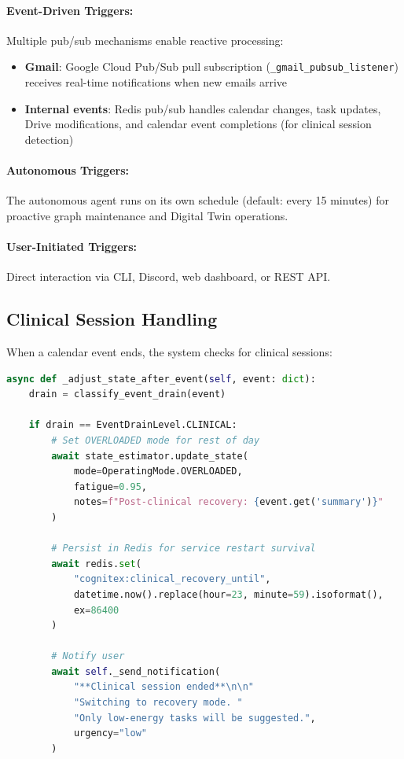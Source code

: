\documentclass[11pt,a4paper]{article}
\begin{document}
\paragraph{Event-Driven Triggers:} Multiple pub/sub mechanisms enable reactive processing:
\begin{itemize}
    \item \textbf{Gmail}: Google Cloud Pub/Sub pull subscription (\texttt{\_gmail\_pubsub\_listener}) receives real-time notifications when new emails arrive
    \item \textbf{Internal events}: Redis pub/sub handles calendar changes, task updates, Drive modifications, and calendar event completions (for clinical session detection)
\end{itemize}

\paragraph{Autonomous Triggers:} The autonomous agent runs on its own schedule (default: every 15 minutes) for proactive graph maintenance and Digital Twin operations.

\paragraph{User-Initiated Triggers:} Direct interaction via CLI, Discord, web dashboard, or REST API.

\subsection{Clinical Session Handling}

When a calendar event ends, the system checks for clinical sessions:

\begin{lstlisting}[language=Python]
async def _adjust_state_after_event(self, event: dict):
    drain = classify_event_drain(event)

    if drain == EventDrainLevel.CLINICAL:
        # Set OVERLOADED mode for rest of day
        await state_estimator.update_state(
            mode=OperatingMode.OVERLOADED,
            fatigue=0.95,
            notes=f"Post-clinical recovery: {event.get('summary')}"
        )

        # Persist in Redis for service restart survival
        await redis.set(
            "cognitex:clinical_recovery_until",
            datetime.now().replace(hour=23, minute=59).isoformat(),
            ex=86400
        )

        # Notify user
        await self._send_notification(
            "**Clinical session ended**\n\n"
            "Switching to recovery mode. "
            "Only low-energy tasks will be suggested.",
            urgency="low"
        )
\end{lstlisting}
\end{document}
